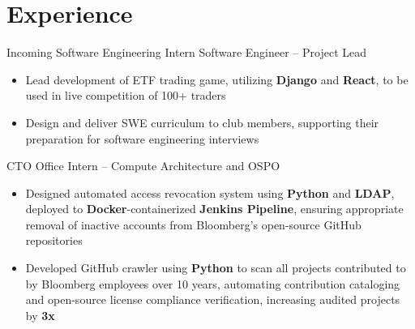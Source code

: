 \documentclass[letterpaper,11pt]{article}
\begin{document}
\section{Experience}
{Incoming Software Engineering Intern}{}
{Software Engineer -- Project Lead}{}
\begin{itemize}
    \item Lead development of ETF trading game, utilizing \textbf{Django}
          and \textbf{React}, to be used in live competition of 100+ traders
    \item Design and deliver SWE curriculum to club members, supporting their
          preparation for software engineering interviews
\end{itemize}
{CTO Office Intern -- Compute Architecture and OSPO}{}
\begin{itemize}
    \item Designed automated access revocation system using \textbf{Python} and
          \textbf{LDAP}, deployed to \textbf{Docker}-containerized
          \textbf{Jenkins Pipeline}, ensuring appropriate removal of inactive
          accounts from Bloomberg's open-source GitHub repositories
    \item Developed GitHub crawler using \textbf{Python} to scan all projects
          contributed to by Bloomberg employees over 10 years, automating
          contribution cataloging and open-source license compliance
          verification, increasing audited projects by \textbf{3x}
\end{itemize}
\end{document}
